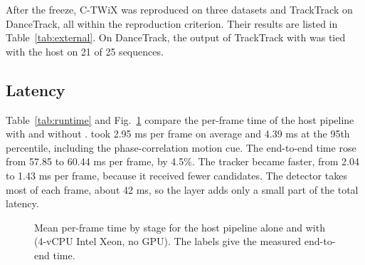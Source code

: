 After the freeze, C-TWiX \cite{miah2025twix} was reproduced on three datasets
and TrackTrack \cite{shim2025tracktrack} on DanceTrack, all within the
reproduction criterion. Their results are listed in Table~\ref{tab:external}. On
DanceTrack, the output of TrackTrack with \scl{} was tied with the host on
21 of 25 sequences.



\subsection{Latency}\label{sec:latency}
Table~\ref{tab:runtime} and Fig.~\ref{fig:runtime} compare the per-frame time
of the host pipeline with and without \scl{}. \scl{} took 2.95 ms per
frame on average and 4.39 ms at the 95th percentile, including the
phase-correlation motion cue. The end-to-end time rose from 57.85 to 60.44 ms
per frame, by 4.5\%. The tracker became faster, from 2.04 to 1.43 ms per
frame, because it received fewer candidates. The detector takes most of each
frame, about 42 ms, so the layer adds only a small part of the total latency.



\begin{figure}[t]
\centering

\caption{Mean per-frame time by stage for the host pipeline alone and with
\scl{} (4-vCPU Intel Xeon, no GPU). The labels give the measured
end-to-end time.}
\label{fig:runtime}
\end{figure}
